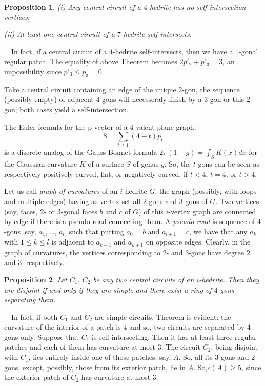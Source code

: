 \documentclass[12pt]{article}
\newtheorem{proposition}{Proposition}
\newcommand{\proof}{\noindent{\bf Proof.}\ \ }
\begin{document}
\begin{proposition}
(i) Any central circuit of a $4$-hedrite has no self-intersection vertices;

(ii) At least one central-circuit of a $7$-hedrite self-intersects.
\end{proposition}
\proof In fact, if a central circuit of a $4$-hedrite self-intersects, then we have a $1$-gonal regular patch. The equality of above Theorem becomes $2p'_2+p'_3=3$, an impossibility since $p'_3\leq p_3=0$.

Take a central circuit containing an edge of the unique $2$-gon, the sequence (possibly empty) of adjacent $4$-gons will necesseraly finish by a $3$-gon or this $2$-gon; both cases yield a self-intersection.






The Euler formula for the p-vector of a $4$-valent plane graph:
$$8=\sum_{t\geq 1} (4-t)p_t$$
is a discrete analog of the Gauss-Bonnet formula $2\pi(1-g)=\int_{S} K(x)dx$ for the Gaussian curvature $K$ of a surface $S$ of genus $g$. So, the $t$-gons can be seen as respectively positively curved, flat, or negatively curved, if $t<4$, $t=4$, or $t>4$.


Let us call {\em graph of curvatures} of an $i$-hedrite $G$, the
graph (possibly, with loops and multiple edges) having as vertex-set
all $2$-gons and $3$-gons of $G$. 
Two vertices (say, faces, $2$- or $3$-gonal faces $b$ and $c$ of $G$) of 
this $i$-vertex graph are connected by edge if there is a pseudo-road 
connecting them. A {\em pseudo-road} is sequence of $4$-gons 
,say, $a_1$, \dots, $a_l$, such that putting $a_0=b$ and $a_{l+1}=c$, 
we have that any $a_k$ with $1\leq k\leq l$ is adjacent to $a_{k-1}$ 
and $a_{k+1}$ on opposite edges. Clearly, in the graph of curvatures, 
the vertices corresponding to $2$- and $3$-gons have degree $2$ and $3$, 
respectively.







\begin{proposition}\label{intersec}
Let $C_1$, $C_2$ be any two central circuits of an $i$-hedrite. Then 
they are disjoint if and only if they are simple and there exist a 
ring of $4$-gons separating them.

\end{proposition}
\proof In fact, if both $C_1$ and $C_2$ are simple circuits, Theorem 
is evident: the curvature of the interior of a patch is $4$ and so, two
circuits are separated by $4$-gons only. Suppose that $C_1$ is 
self-intersecting. Then it has at least three regular patches and each 
of them has curvature at most $3$.
The circuit $C_2$, being disjoint with $C_1$, lies entirely inside one 
of those patches, say, $A$. So, all its $3$-gons and $2$-gons, except, 
possibly, those from its exterior patch, lie in $A$. So,$c(A)\geq 5$,
since the exterior patch of $C_2$ has curvature at most $3$.
\end{document}
